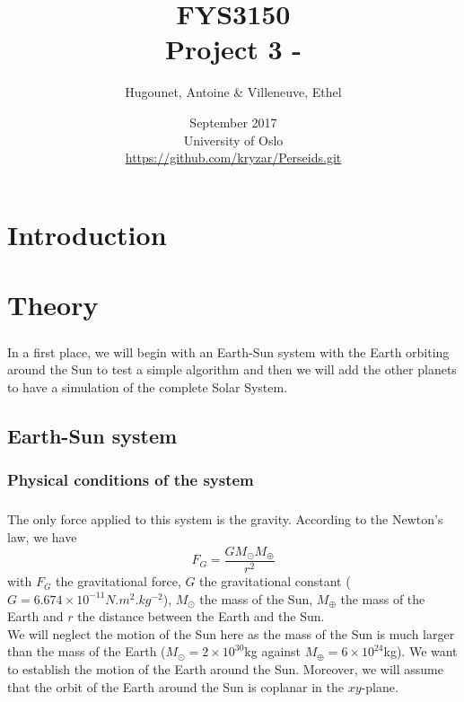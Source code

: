 \documentclass[a4paper, twoside, 11pt]{report}
\title{FYS3150\\Project 3 - }
\author{Hugounet, Antoine \& Villeneuve, Ethel}
\date{September 2017 \\University of Oslo \\ \url{https://github.com/kryzar/Perseids.git}}
\theoremstyle{theorem}
\theoremstyle{remark}
\theoremstyle{exemple}
\begin{document}
\maketitle
	
	
\begin{abstract}

	\paragraph{}
	
\end{abstract}


\tableofcontents


\chapter*{Introduction}

    \paragraph{}
    

\chapter{Theory}
    
    \paragraph{}In a first place, we will begin with an Earth-Sun system with the Earth orbiting around the Sun to test a simple algorithm and then we will add the other planets to have a simulation of the complete Solar System. 

    \section{Earth-Sun system}
        \subsection{Physical conditions of the system}
            \paragraph{}The only force applied to this system is the gravity. According to the Newton's law, we have 
                \begin{equation*}
                F_G = \frac{GM_{\odot}M_{\oplus}}{r^2}
                \end{equation*}
            with $F_G$ the gravitational force, $G$ the gravitational constant ($G=6.674 \times 10^{-11} N.m^2.kg^{-2}$), $M_{\odot}$ the mass of the Sun, $M_{\oplus}$ the mass of the Earth and $r$ the distance between the Earth and the Sun.\\
            We will neglect the motion of the Sun here as the mass of the Sun is much larger than the mass of the Earth ($M_{\odot} = 2 \times 10^{30}$kg against $M_{\oplus} = 6 \times 10^{24}$kg). We want to establish the motion of the Earth around the Sun. Moreover, we will assume that the orbit of the Earth around the Sun is coplanar in the $xy$-plane.
\end{document}
